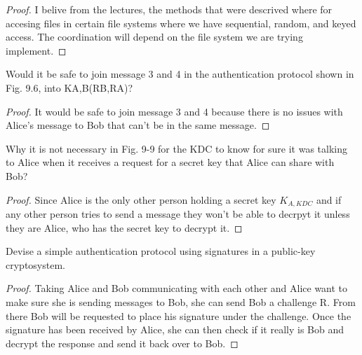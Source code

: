 \documentclass[12pt]{article}
\newenvironment{exercise}[2][Exercise]{\begin{trivlist}
\item[\hskip \labelsep {\bfseries #1}\hskip \labelsep {\bfseries #2.}]}{\end{trivlist}}
\begin{document}
\begin{proof}
I belive from the lectures, the methods that were descrived where for accesing files in certain file systems where we have sequential, random, and keyed access. The coordination will depend on the file system we are trying implement. 
\end{proof}


\begin{exercise}{14}
Would it be safe to join message 3 and 4 in the authentication protocol shown in Fig. 9.6, into KA,B(RB,RA)?
\end{exercise}

\begin{proof}
It would be safe to join message 3 and 4 because there is no issues with Alice's message to Bob that can't be in the same message. 
\end{proof}

\begin{exercise}{15}
Why it is not necessary in Fig. 9-9 for the KDC to know for sure it was talking to Alice when it receives a request for a secret key that Alice can share with Bob?
\end{exercise}

\begin{proof}
Since Alice is the only other person holding a secret key $K_{A,KDC}$ and if any other person tries to send a message they won't be able to decrpyt it unless they are Alice, who has the secret key to decrypt it.
\end{proof}

\begin{exercise}{16}
Devise a simple authentication protocol using signatures in a public-key cryptosystem. 
\end{exercise}

\begin{proof}
Taking Alice and Bob communicating with each other and Alice want to make sure she is sending messages to Bob, she can send Bob a challenge R. From there Bob will be requested to place his signature under the challenge. Once the signature has been received by Alice, she can then check if it really is Bob and decrypt the response and send it back over to Bob. 
\end{proof}
\end{document}
